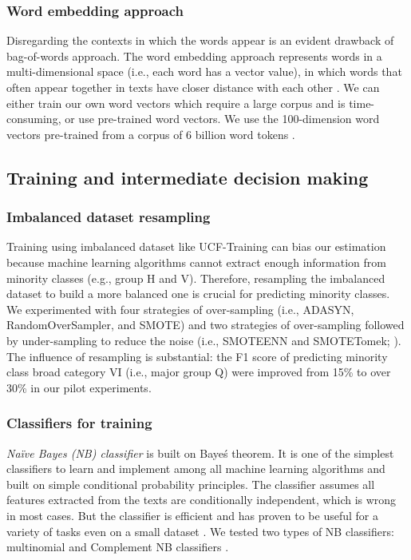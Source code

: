 \documentclass[11pt]{article}
\begin{document}
\subsubsection{Word embedding approach}

Disregarding the contexts in which the words appear is an evident drawback of bag-of-words approach. The word embedding approach represents words in a multi-dimensional space (i.e., each word has a vector value), in which words that often appear together in texts have closer distance with each other \parencites[][290]{JurafskySpeechLanguageProcessing2017}[][65]{BengfortAppliedTextAnalysis2018}. We can either train our own word vectors which require a large corpus and is time-consuming, or use pre-trained word vectors. We use the 100-dimension word vectors pre-trained from a corpus of 6 billion word tokens \parencite{PenningtonGloveGlobalVectors2014}.

\subsection{Training and intermediate decision making}

\subsubsection{Imbalanced dataset resampling}

Training using imbalanced dataset like UCF-Training can bias our estimation because machine learning algorithms cannot extract enough information from minority classes (e.g., group H and V). Therefore, resampling the imbalanced dataset to build a more balanced one is crucial for predicting minority classes. We experimented with four strategies of over-sampling (i.e., ADASYN, RandomOverSampler, and SMOTE) and two strategies of over-sampling followed by under-sampling to reduce the noise (i.e., SMOTEENN and SMOTETomek; \cite{LemaitreImbalancedlearnPythonToolbox2017}). The influence of resampling is substantial: the F1 score of predicting minority class broad category VI (i.e., major group Q) were improved from 15\% to over 30\% in our pilot experiments.

\subsubsection{Classifiers for training}

\textit{Na\"ive Bayes (NB) classifier} is built on Baye\'s theorem. It is one of the simplest classifiers to learn and implement among all machine learning algorithms and built on simple conditional probability principles. The classifier assumes all features extracted from the texts are conditionally independent, which is wrong in most cases. But the classifier is efficient and has proven to be useful for a variety of tasks even on a small dataset \parencites[][76]{JurafskySpeechLanguageProcessing2017}[][277]{GrimmerTextDataPromise2013}. We tested two types of NB classifiers: multinomial and Complement NB classifiers \parencite{RennieTacklingPoorAssumptions2003}.
\end{document}
